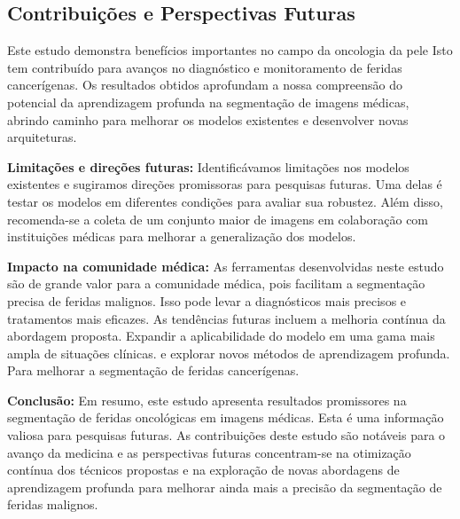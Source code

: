 \subsection{Contribuições e Perspectivas Futuras}

    Este estudo demonstra benefícios importantes no campo da oncologia da pele Isto tem contribuído para avanços no diagnóstico e monitoramento de feridas cancerígenas. Os resultados obtidos aprofundam a nossa compreensão do potencial da aprendizagem profunda na segmentação de imagens médicas, abrindo caminho para melhorar os modelos existentes e desenvolver novas arquiteturas.

    \textbf{Limitações e direções futuras:} Identificávamos limitações nos modelos existentes e sugiramos direções promissoras para pesquisas futuras. Uma delas é testar os modelos em diferentes condições para avaliar sua robustez. Além disso, recomenda-se a coleta de um conjunto maior de imagens em colaboração com instituições médicas para melhorar a generalização dos modelos.

    \textbf{Impacto na comunidade médica:} As ferramentas desenvolvidas neste estudo são de grande valor para a comunidade médica, pois facilitam a segmentação precisa de feridas malignos. Isso pode levar a diagnósticos mais precisos e tratamentos mais eficazes. As tendências futuras incluem a melhoria contínua da abordagem proposta. Expandir a aplicabilidade do modelo em uma gama mais ampla de situações clínicas. e explorar novos métodos de aprendizagem profunda. Para melhorar a segmentação de feridas cancerígenas.

    \textbf{Conclusão:} Em resumo, este estudo apresenta resultados promissores na segmentação de feridas oncológicas em imagens médicas. Esta é uma informação valiosa para pesquisas futuras. As contribuições deste estudo são notáveis para o avanço da medicina e as perspectivas futuras concentram-se na otimização contínua dos técnicos propostas e na exploração de novas abordagens de aprendizagem profunda para melhorar ainda mais a precisão da segmentação de feridas malignos.